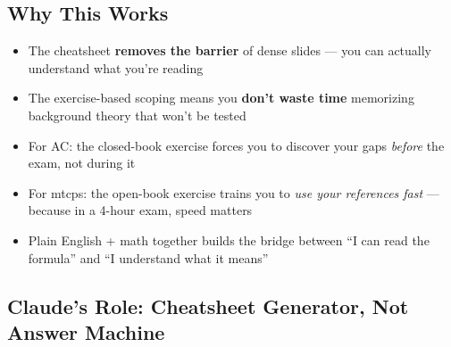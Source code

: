 \documentclass[11pt,a4paper]{article}
\begin{document}
\subsection{Why This Works}

\begin{itemize}[nosep]
\item The cheatsheet \textbf{removes the barrier} of dense slides --- you can actually understand what you're reading
\item The exercise-based scoping means you \textbf{don't waste time} memorizing background theory that won't be tested
\item For AC: the closed-book exercise forces you to discover your gaps \textit{before} the exam, not during it
\item For mtcps: the open-book exercise trains you to \textit{use your references fast} --- because in a 4-hour exam, speed matters
\item Plain English + math together builds the bridge between ``I can read the formula'' and ``I understand what it means''
\end{itemize}

\subsection{Claude's Role: Cheatsheet Generator, Not Answer Machine}

\begin{center}
\end{center}
\end{document}
